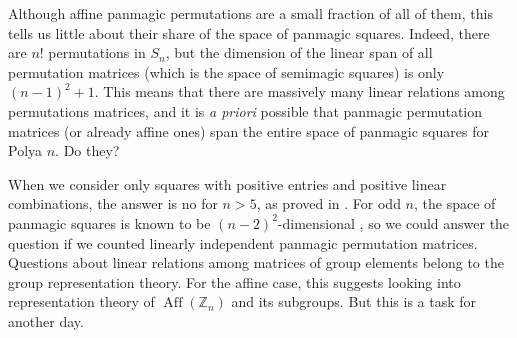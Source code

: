 \documentclass[11pt]{article}
\theoremstyle{plain}
\theoremstyle{definition}
\newcommand{\+}[1]{{#1}^\times}
\def\Aff{\operatorname{Aff}}
\def\Z{{\mathbb Z}}
\begin{document}
Although affine panmagic permutations are a small fraction of all of them, this tells us little about their share of the space of panmagic squares. Indeed, there are $n!$ permutations in $S_n$, but the dimension of the linear span of all permutation matrices (which is the space of semimagic squares) is only $(n-1)^2+1$. This means that there are massively many linear relations among permutations matrices, and it is {\it a priori} possible that panmagic permutation matrices (or already affine ones) span the entire space of panmagic squares for Polya $n$. Do they? 

When we consider only squares with positive entries and positive linear combinations, the answer is no for $n>5$, as proved in \cite{AlKi}. For odd $n$, the space of panmagic squares is known to be $(n-2)^2$-dimensional \cite{Hou}, so we could answer the question if we counted linearly independent panmagic  permutation matrices. Questions about linear relations among matrices of group elements belong to the group representation theory. For the affine case, this suggests looking into representation theory of $\Aff(\Z_n)$ and its subgroups. But this is a task for another day.
\end{document}
